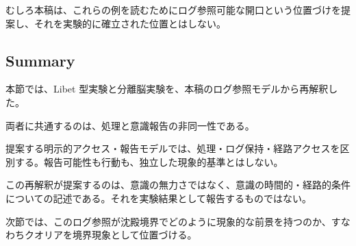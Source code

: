 むしろ本稿は、これらの例を読むためにログ参照可能な開口という位置づけを提案し、それを実験的に確立された位置とはしない。

\subsection{Summary}

本節では、Libet 型実験と分離脳実験を、本稿のログ参照モデルから再解釈した。

両者に共通するのは、処理と意識報告の非同一性である。

提案する明示的アクセス・報告モデルでは、処理・ログ保持・経路アクセスを区別する。報告可能性も行動も、独立した現象的基準とはしない。

この再解釈が提案するのは、意識の無力さではなく、意識の時間的・経路的条件についての記述である。それを実験結果として報告するものではない。

次節では、このログ参照が沈殿境界でどのように現象的な前景を持つのか、すなわちクオリアを境界現象として位置づける。
